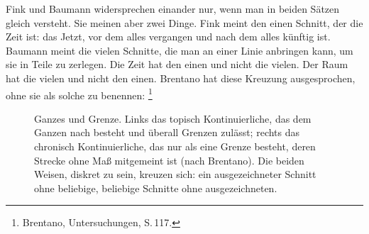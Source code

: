Fink und Baumann widersprechen einander nur, wenn man  in beiden Sätzen gleich versteht. Sie meinen aber zwei Dinge. Fink meint den einen Schnitt, der die Zeit ist: das Jetzt, vor dem alles vergangen und nach dem alles künftig ist. Baumann meint die vielen Schnitte, die man an einer Linie anbringen kann, um sie in Teile zu zerlegen. Die Zeit hat den einen und nicht die vielen. Der Raum hat die vielen und nicht den einen. Brentano hat diese Kreuzung ausgesprochen, ohne sie als solche zu benennen: \footnote{Brentano, Untersuchungen, S.\,117.}

\begin{figure}[htbp]
\centering
{}
\caption{Ganzes und Grenze. Links das topisch Kontinuierliche, das dem Ganzen nach besteht und überall Grenzen zulässt; rechts das chronisch Kontinuierliche, das nur als eine Grenze besteht, deren Strecke ohne Maß mitgemeint ist (nach Brentano). Die beiden Weisen, diskret zu sein, kreuzen sich: ein ausgezeichneter Schnitt ohne beliebige, beliebige Schnitte ohne ausgezeichneten.}
\label{abb:grenze}
\end{figure}

